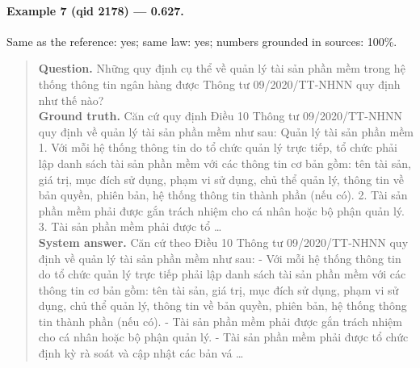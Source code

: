 \paragraph{Example 7 (qid 2178) --- \rl{} 0.627.} Same \dieu{} as the reference: yes; same law: yes; numbers grounded in sources: 100\%.
\begin{quote}\small\textbf{Question.} Những quy định cụ thể về quản lý tài sản phần mềm trong hệ thống thông tin ngân hàng được Thông tư 09/2020/TT-NHNN quy định như thế nào?\\[2pt]
\textbf{Ground truth.} Căn cứ quy định Điều 10 Thông tư 09/2020/TT-NHNN quy định về quản lý tài sản phần mềm như sau: Quản lý tài sản phần mềm 1. Với mỗi hệ thống thông tin do tổ chức quản lý trực tiếp, tổ chức phải lập danh sách tài sản phần mềm với các thông tin cơ bản gồm: tên tài sản, giá trị, mục đích sử dụng, phạm vi sử dụng, chủ thể quản lý, thông tin về bản quyền, phiên bản, hệ thống thông tin thành phần (nếu có). 2. Tài sản phần mềm phải được gắn trách nhiệm cho cá nhân hoặc bộ phận quản lý. 3. Tài sản phần mềm phải được tổ …\\[2pt]
\textbf{System answer.} Căn cứ theo Điều 10 Thông tư 09/2020/TT-NHNN quy định về quản lý tài sản phần mềm như sau: - Với mỗi hệ thống thông tin do tổ chức quản lý trực tiếp phải lập danh sách tài sản phần mềm với các thông tin cơ bản gồm: tên tài sản, giá trị, mục đích sử dụng, phạm vi sử dụng, chủ thể quản lý, thông tin về bản quyền, phiên bản, hệ thống thông tin thành phần (nếu có). - Tài sản phần mềm phải được gắn trách nhiệm cho cá nhân hoặc bộ phận quản lý. - Tài sản phần mềm phải được tổ chức định kỳ rà soát và cập nhật các bản vá …\end{quote}

